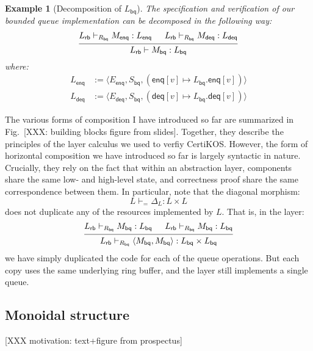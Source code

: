 \documentclass[11pt,oneside,draft]{book}
\newtheorem{example}[theorem]{Example}
\theoremstyle{definition}
\newcommand{\kw}[1]{\ensuremath{ \mathsf{#1} }}
\begin{document}
\begin{example}[Decomposition of $L_\kw{bq}$]
The specification and verification of
our bounded queue implementation can be decomposed
in the following way:
\[
  \begin{prooftree}
    \hypo{L_\kw{rb} \vdash_{R_\kw{bq}} M_\kw{enq} : L_\kw{enq}}
    \hypo{L_\kw{rb} \vdash_{R_\kw{bq}} M_\kw{deq} : L_\kw{deq}}
    \infer2{L_\kw{rb} \vdash M_\kw{bq} : L_\kw{bq}}
  \end{prooftree}
\]
where:
\begin{align*}
  L_\kw{enq} &:=
    \langle E_\kw{enq}, S_\kw{bq},
      (\kw{enq}[v] \mapsto L_\kw{bq}.\kw{enq}[v]) \rangle \\
  L_\kw{deq} &:=
    \langle E_\kw{deq}, S_\kw{bq},
      (\kw{deq}[v] \mapsto L_\kw{bq}.\kw{deq}[v]) \rangle
\end{align*}
\end{example}

The various forms of composition I have introduced so far
are summarized in Fig.~[XXX: building blocks figure from slides].
Together,
they describe the principles of the layer calculus we used
to verfiy CertiKOS.
However,
the form of horizontal composition we have introduced so far
is largely syntactic in nature.
Crucially,
they rely on the fact that within an abstraction layer,
components share the same low- and high-level state,
and correctness proof share the same correspondence between them.
In particular,
note that the diagonal morphism:
\[
  L \vdash_{=} \Delta_L : L \times L
\]
does not duplicate any of the resources implemented by $L$.
That is, in the layer:
\[
  \begin{prooftree}
    \hypo{L_\kw{rb} \vdash_{R_\kw{bq}} M_\kw{bq} : L_\kw{bq}}
    \hypo{L_\kw{rb} \vdash_{R_\kw{bq}} M_\kw{bq} : L_\kw{bq}}
    \infer2{L_\kw{rb} \vdash_{R_\kw{bq}}
      \langle M_\kw{bq}, M_\kw{bq} \rangle :
      L_\kw{bq} \times L_\kw{bq}}
  \end{prooftree}
\]
we have simply duplicated the code for each of the queue operations.
But each copy uses the same underlying ring buffer,
and the layer still implements a single queue.


\subsection{Monoidal structure} \label{sec:layermon} %


[XXX motivation: text+figure from prospectus]
\end{document}
